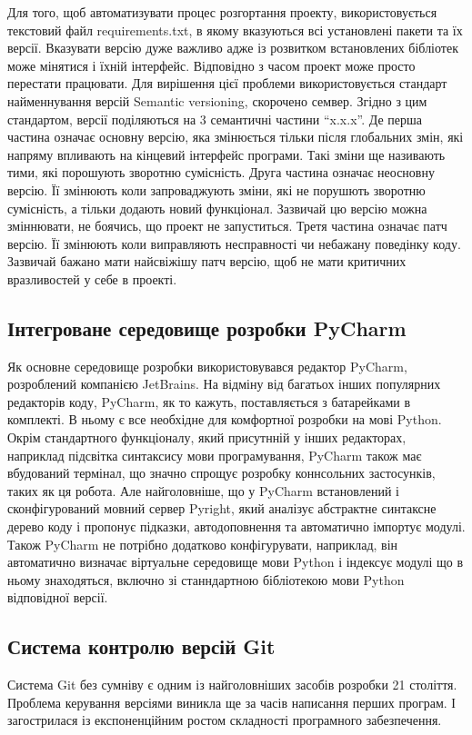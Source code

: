 Для того, щоб автоматизувати процес розгортання проекту, використовується
текстовий файл requirements.txt, в якому вказуються всі установлені пакети
та їх версії. Вказувати версію дуже важливо адже із розвитком встановлених
бібліотек може мінятися і їхній інтерфейс. Відповідно з часом проект може
просто перестати працювати. Для вирішення цієї проблеми використовується
стандарт найменнування версій Semantic versioning, скорочено семвер.
Згідно з цим стандартом, версії поділяються на 3 семантичні
частини ``x.x.x''. Де перша частина означає основну версію, яка змінюється
тільки після глобальних змін, які напряму впливають на кінцевий інтерфейс
програми. Такі зміни ще називають тими, які порошують зворотню сумісність.
Друга частина означає неосновну версію. Її змінюють коли запроваджують
зміни, які не порушють зворотню сумісність, а тільки додають новий функціонал.
Зазвичай цю версію можна зміннювати, не боячись, що проект не запуститься.
Третя частина означає патч версію. Її змінюють коли виправляють несправності
чи небажану поведінку коду. Зазвичай бажано мати найсвіжішу патч версію,
щоб не мати критичних вразливостей у себе в проекті.

\subsection{Інтегроване середовище розробки PyCharm}
Як основне середовище розробки використовувався редактор PyCharm, 
розроблений компанією JetBrains. На відміну від багатьох інших
популярних редакторів коду, PyCharm, як то кажуть, поставляється з батарейками
в комплекті. В ньому є все необхідне для комфортної розробки на мові
Python. Окрім стандартного функціоналу, який присутнній у інших
редакторах, наприклад підсвітка синтаксису мови програмування,
PyCharm також має вбудований термінал, що значно спрощує розробку
коннсольних застосунків, таких як ця робота. Але найголовніше,
що у PyCharm встановлений і сконфігурований мовний сервер Pyright,
який аналізує абстрактне синтаксне дерево коду і пропонує підказки,
автодоповнення та автоматично імпортує модулі. Також PyCharm не потрібно
додатково конфігурувати, наприклад, він автоматично визначає віртуальне
середовище мови Python і індексує модулі що в ньому знаходяться,
включно зі станндартною бібліотекою мови Python відповідної версії.

\subsection{Система контролю версій Git}
Система Git без сумніву є одним із найголовніших засобів розробки 21 століття. Проблема
керування версіями виникла ще за часів написання перших програм. І загострилася із
експоненційним ростом складності програмного забезпечення.

